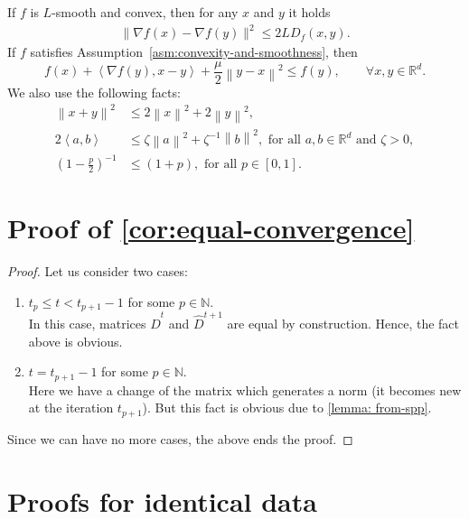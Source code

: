 \documentclass[sn-mathphys,Numbered]{sn-jnl}%
\newcommand*{\R}{{\mathbb R}}
\renewcommand{\|}{\parallel}
\newcommand\ev[1]{\left \langle #1 \right \rangle}
\newcommand{\sqn}[1]{{\left\lVert#1\right\rVert}^2}
\renewcommand {\*} {\ast}
\def\R{\mathbb{R}}
\begin{document}
If $f$ is $L$-smooth and convex, then for any $x$ and $y$ it holds
\begin{align}
    \label{pr:bregman_div}
    \|\nabla f(x) - \nabla f(y)\|^2
    \le 2LD_f(x, y). 
\end{align}
\noindent If $f$ satisfies Assumption~\ref{asm:convexity-and-smoothness}, then
\begin{equation}
     \label{pr:asm-strong-convexity}
     f(x) + \ev{\nabla f(y), x - y} + \frac{\mu}{2} \sqn{y - x} \leq f(y), \qquad \forall x, y \in \R^d.
\end{equation}
\noindent We also use the following facts:
\begin{align}
    \sqn{x + y} &\leq 2 \sqn{x} + 2 \sqn{y}, \label{pr:sum_sqnorm} \\
    2 \ev{a, b} &\leq \zeta \sqn{a} + \zeta^{-1} \sqn{b}, \text { for all } a, b \in \R^d \text { and } \zeta > 0, \label{pr:youngs-inequality}\\
    \left( 1 - \frac{p}{2}\right)^{-1} &\leq (1 + p), \text{ for all } p \in \left[0, 1\right].
    \label{pr: algebraic}
\end{align}

\section{Proof of \cref{cor:equal-convergence}}
\begin{proof}
    Let us consider two cases:
    \begin{enumerate}
        \item $t_p \leq t < t_{p+1} - 1$ for some $p \in \mathbb{N}$.\\
        In this case, matrices $\hat{D}^{t}$ and $\hat{D}^{t+1}$ are equal by construction. Hence, the fact above is obvious.
        \item $t = t_{p+1} - 1$ for some $p \in \mathbb{N}$.\\
        Here we have a change of the matrix which generates a norm (it becomes new at the iteration $t_{p+1}$). But this fact is obvious due to \cref{lemma: from-spp}.
    \end{enumerate}
    Since we can have no more cases, the above ends the proof.
\end{proof}

\section{Proofs for identical data}\label{ident}
\end{document}
